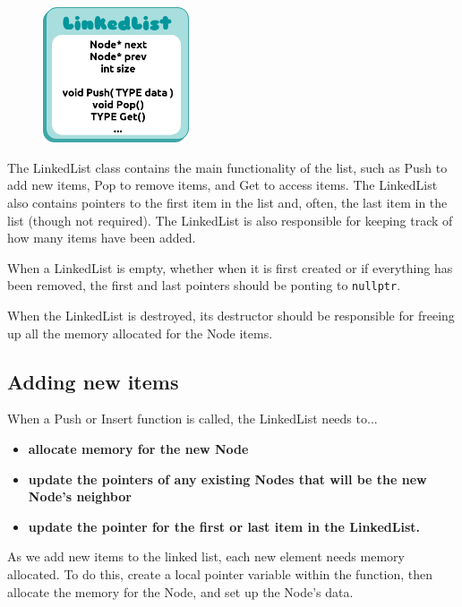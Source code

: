 \documentclass[a4paper,12pt,onepage]{book}
\begin{document}
        \begin{figure}
        \includegraphics[height=4cm]{images/justalist.png}
        \end{figure}
        
        The LinkedList class contains the main functionality of the list,
        such as Push to add new items, Pop to remove items, and Get to access items.
        The LinkedList also contains pointers to the first item in the list and,
        often, the last item in the list (though not required).
        The LinkedList is also responsible for keeping track of how many items
        have been added.

        When a LinkedList is empty, whether when it is first created or if everything
        has been removed, the first and last pointers should be ponting to
        \texttt{nullptr}.
        
        When the LinkedList is destroyed, its destructor should be responsible
        for freeing up all the memory allocated for the Node items.

    \subsection*{Adding new items}
    
        When a Push or Insert function is called, the LinkedList needs to...
        
        \begin{itemize}
            \item \textbf{allocate memory for the new Node}
            \item \textbf{update the pointers of any existing Nodes that will be the new Node's neighbor}
            \item \textbf{update the pointer for the first or last item in the LinkedList.}
        \end{itemize}
    
        As we add new items to the linked list, each new element needs memory allocated.
        To do this, create a local pointer variable within the function, then allocate the 
        memory for the Node, and set up the Node's data.
        
\end{document}
